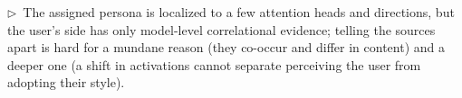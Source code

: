 \documentclass[11pt]{article}
\newcommand{\flow}[1]{\par\noindent\textcolor{blue!60!black}{\small$\triangleright$\ #1}\par\medskip}
\begin{document}
\flow{The assigned persona is localized to a few attention heads and directions, but the user's side has only model-level correlational evidence; telling the sources apart is hard for a mundane reason (they co-occur and differ in content) and a deeper one (a shift in activations cannot separate perceiving the user from adopting their style).}
\end{document}
